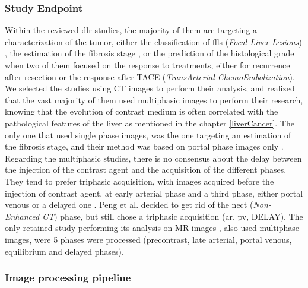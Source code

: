 \subsubsection{Study Endpoint}\label{study-endpoint}

Within the reviewed \ac{dlr} studies, the majority of them are
targeting a characterization of the tumor, either the classification of \ac{fll}s (\emph{Focal
Liver Lesions}) \cite{Yamada2019,Wang2018,Yasaka2018,Liang2018}, the estimation of the fibrosis
stage \cite{Yasaka2018a}, or the prediction of the histological grade \cite{Yang2019} when two of them focused on the
response to treatments, either for recurrence after resection \cite{WANG2019} or the response after TACE (\emph{TransArterial ChemoEmbolization})\cite{Peng2020}.\\
We selected the studies using CT images to perform their
analysis, and realized that the vast majority of them used multiphasic
images to perform their research, knowing that the evolution of contrast
medium is often correlated with the pathological features of the liver
as mentioned in the chapter \ref{liverCancer}. The only one that used
single phase images, was the one targeting an estimation of the fibrosis
stage, and their method was based on portal phase images only \cite{Yasaka2018a}. 
Regarding the multiphasic studies,
there is no consensus about the delay between the injection of the
contrast agent and the acquisition of the different phases. They tend to
prefer triphasic acquisition, with images acquired before the injection
of contrast agent, at early arterial phase and a third phase, either
portal venous \cite{WANG2019,Wang2018,Liang2018} or a delayed one \cite{Yamada2019, Yasaka2018}. Peng et al. decided to get rid of the \ac{nect}
(\emph{Non-Enhanced CT}) phase, but still chose a triphasic acquisition
(\ac{ar}, \ac{pv}, DELAY).
The only retained study performing its analysis on MR images \cite{Yang2019}, also used multiphase images, were 5 phases were processed (precontrast, late arterial, portal venous, equilibrium and delayed phases).

\subsubsection{Image processing pipeline}\label{image-processing-pipeline}

